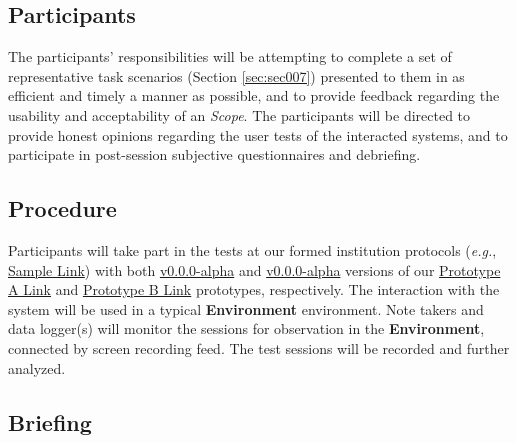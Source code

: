 \subsection{Participants}

The participants' responsibilities will be attempting to complete a set of representative task scenarios (Section \ref{sec:sec007}) presented to them in as efficient and timely a manner as possible, and to provide feedback regarding the usability and acceptability of an \textit{Scope}. The participants will be directed to provide honest opinions regarding the user tests of the interacted systems, and to participate in post-session subjective questionnaires and debriefing.



\subsection{Procedure}

Participants will take part in the tests at our formed institution protocols (\textit{e.g.}, \hyperlink{}{Sample Link}) with both \hyperlink{}{v0.0.0-alpha} and \hyperlink{}{v0.0.0-alpha} versions of our \hyperlink{}{Prototype A Link} and \hyperlink{}{Prototype B Link} prototypes, respectively. The interaction with the system will be used in a typical \textbf{Environment} environment. Note takers and data logger(s) will monitor the sessions for observation in the \textbf{Environment}, connected by screen recording feed. The test sessions will be recorded and further analyzed.



\subsection{Briefing}

